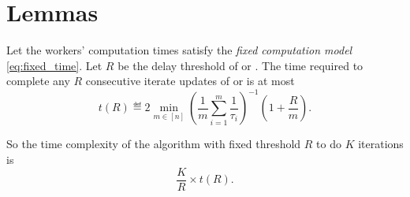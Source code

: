 \documentclass{article}
\begin{document}
\section{Lemmas}

\begin{lemma}
    \label{lem:time_R}
    Let the workers' computation times satisfy the \emph{fixed computation model} \eqref{eq:fixed_time}.
    Let $R$ be the delay threshold of  or .
    The time required to complete any $R$ consecutive iterate updates of  or  is at most
    \begin{equation}\label{eq:time_R}
       t(R) 
       \eqdef 2 \min\limits_{m \in [n]} \left(\frac{1}{m} \sum\limits_{i=1}^m \frac{1}{\tau_i}\right)^{-1} \left( 1 + \frac{R}{m} \right).
    \end{equation}
\end{lemma}

So the time complexity of the algorithm with fixed threshold $R$ to do $K$ iterations is
$$
    \frac{K}{R}\times t(R).
$$
% 
\end{document}
